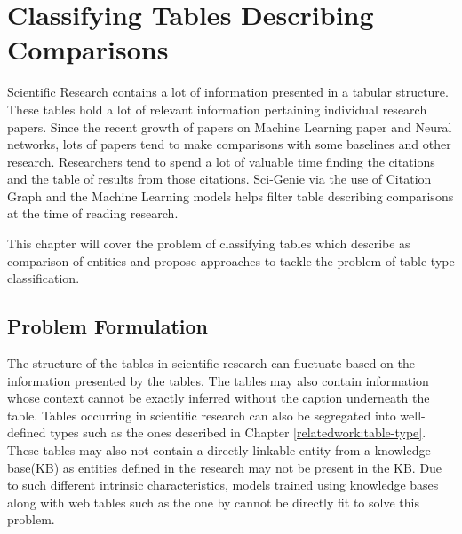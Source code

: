 \chapter{Classifying Tables Describing Comparisons}
\label{table_classification}
Scientific Research contains a lot of information presented in a tabular structure. These tables hold a lot of relevant information pertaining individual research papers. Since the recent growth of papers on Machine Learning paper and  Neural networks, lots of papers tend to make comparisons with some baselines and other research. Researchers tend to spend a lot of valuable time finding the citations and the table of results from those citations. Sci-Genie via the use of Citation Graph and the Machine Learning models helps filter table describing comparisons at the time of reading research. 

This chapter will cover the problem of classifying tables which describe as comparison of entities and propose approaches to tackle the problem of table type classification. 

\section{Problem Formulation}

The structure of the tables in scientific research can fluctuate based on the information presented by the tables. The tables may also contain information whose context cannot be exactly inferred without the caption underneath the table. Tables occurring in scientific research can also be segregated into well-defined types such as the ones described in Chapter \ref{relatedwork:table-type}. These tables may also not contain a directly linkable entity from a knowledge base(KB) as entities defined in the research may not be present in the KB. Due to such different intrinsic characteristics, models trained using knowledge bases along with web tables such as the one by \cite{deng2020turl} cannot be directly fit to solve this problem. 


